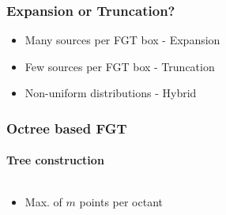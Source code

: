 
\begin{frame}
\frametitle{Expansion or Truncation?}
\begin{itemize}
\item Many sources per FGT box - Expansion
\newline
\item Few sources per FGT box - Truncation
\newline
\item Non-uniform distributions - Hybrid
\end{itemize}
\end{frame}


\begin{frame}
\frametitle{Octree based FGT}
\framesubtitle{Tree construction}
\begin{columns}[T]
\begin{column}{0.4\textwidth}
\begin{itemize}
\item Max. of $m$ points per octant
\end{itemize}
\end{column}
\begin{column}{0.6\textwidth}
 {

}
 {

}
 {

}
\end{column}
\end{columns}
\end{frame}


